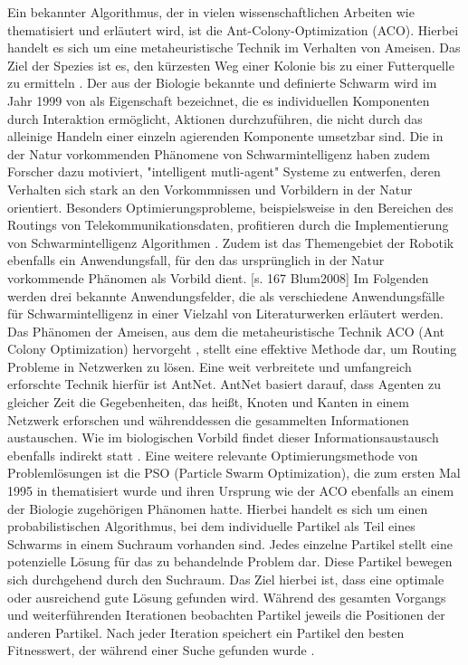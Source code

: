 Ein bekannter Algorithmus, der in vielen wissenschaftlichen Arbeiten wie \cite{Blum2008,Parpinelli2011,Brownlee2011} thematisiert und erläutert wird, ist die Ant-Colony-Optimization (ACO). Hierbei handelt es sich um eine metaheuristische Technik im Verhalten von Ameisen. Das Ziel der Spezies ist es, den kürzesten Weg einer Kolonie bis zu einer Futterquelle zu ermitteln \cite{Parpinelli2011}. Der aus der Biologie bekannte und definierte Schwarm wird im Jahr 1999 von \cite{Bonabeau1999} als Eigenschaft bezeichnet, die es individuellen Komponenten durch Interaktion ermöglicht, Aktionen durchzuführen, die nicht durch das alleinige Handeln einer einzeln agierenden Komponente umsetzbar sind. 
Die in der Natur vorkommenden Phänomene von Schwarmintelligenz haben zudem Forscher dazu motiviert, "intelligent mutli-agent" Systeme zu entwerfen, deren Verhalten sich stark an den Vorkommnissen und Vorbildern in der Natur orientiert. Besonders Optimierungsprobleme, beispielsweise in den Bereichen des Routings von Telekommunikationsdaten, profitieren durch die Implementierung von Schwarmintelligenz Algorithmen \cite{Blum2008}. Zudem ist das Themengebiet der Robotik ebenfalls ein Anwendungsfall, für den das ursprünglich in der Natur vorkommende Phänomen als Vorbild dient. [s. 167 Blum2008]
Im Folgenden werden drei bekannte Anwendungsfelder, die als verschiedene Anwendungsfälle für Schwarmintelligenz in einer Vielzahl von Literaturwerken \cite{Blum2008,Parpinelli2011,Eberhart2001,Spears2005} erläutert werden.
Das Phänomen der Ameisen, aus dem die metaheuristische Technik ACO (Ant Colony Optimization) hervorgeht \cite{Blum2008, Panigrahi2011, Gendreau2010}, stellt eine effektive Methode dar, um Routing Probleme in Netzwerken zu lösen. Eine weit verbreitete und umfangreich erforschte Technik hierfür ist AntNet. AntNet basiert darauf, dass Agenten zu gleicher Zeit die Gegebenheiten, das heißt, Knoten und Kanten in einem Netzwerk erforschen und währenddessen die gesammelten Informationen austauschen. Wie im biologischen Vorbild findet dieser Informationsaustausch ebenfalls indirekt statt \cite{DiCaro2011}. 
Eine weitere relevante Optimierungsmethode von Problemlösungen ist die PSO (Particle Swarm Optimization), die zum ersten Mal 1995 in \cite{Kennedy1995} thematisiert wurde und ihren Ursprung wie der ACO ebenfalls an einem der Biologie zugehörigen Phänomen hatte. Hierbei handelt es sich um einen probabilistischen Algorithmus, bei dem individuelle Partikel als Teil eines Schwarms in einem Suchraum vorhanden sind. Jedes einzelne Partikel stellt eine potenzielle Lösung für das zu behandelnde Problem dar. Diese Partikel bewegen sich durchgehend durch den Suchraum. Das Ziel hierbei ist, dass eine optimale oder ausreichend gute Lösung gefunden wird. Während des gesamten Vorgangs und weiterführenden Iterationen beobachten Partikel jeweils die Positionen der anderen Partikel. Nach jeder Iteration speichert ein Partikel den besten Fitnesswert, der während einer Suche gefunden wurde  \cite{Blum2008}.
